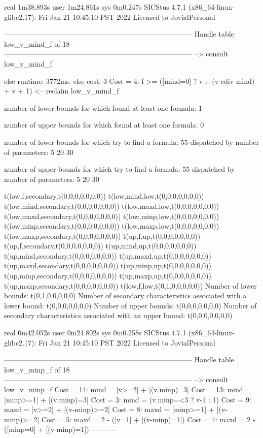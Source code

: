 real	1m38.893s
user	1m24.861s
sys	0m0.247s
SICStus 4.7.1 (x86_64-linux-glibc2.17): Fri Jan 21 10:45:10 PST 2022
Licensed to JovialPersonal


--------------------------------------------------------------------------------
Handle table low_v_mind_f of 18
--------------------------------------------------------------------------------
--> consult low_v_mind_f

else runtime: 3772ms. else cost: 3
Cost =  4:  f >= ([mind=0] ? v : -(v cdiv mind) + v + 1) %
<-- reclaim low_v_mind_f

number of lower bounds for which found at least one formula: 1

number of upper bounds for which found at least one formula: 0

number of lower bounds for which try to find a formula: 55
dispatched by number of parameters: 5  20  30

number of upper bounds for which try to find a formula: 55
dispatched by number of parameters: 5  20  30

t(low,f,secondary,t(0,0,0,0,0,0,0))
t(low,mind,low,t(0,0,0,0,0,0,0))
t(low,mind,secondary,t(0,0,0,0,0,0,0))
t(low,maxd,low,t(0,0,0,0,0,0,0))
t(low,maxd,secondary,t(0,0,0,0,0,0,0))
t(low,minp,low,t(0,0,0,0,0,0,0))
t(low,minp,secondary,t(0,0,0,0,0,0,0))
t(low,maxp,low,t(0,0,0,0,0,0,0))
t(low,maxp,secondary,t(0,0,0,0,0,0,0))
t(up,f,up,t(0,0,0,0,0,0,0))
t(up,f,secondary,t(0,0,0,0,0,0,0))
t(up,mind,up,t(0,0,0,0,0,0,0))
t(up,mind,secondary,t(0,0,0,0,0,0,0))
t(up,maxd,up,t(0,0,0,0,0,0,0))
t(up,maxd,secondary,t(0,0,0,0,0,0,0))
t(up,minp,up,t(0,0,0,0,0,0,0))
t(up,minp,secondary,t(0,0,0,0,0,0,0))
t(up,maxp,up,t(0,0,0,0,0,0,0))
t(up,maxp,secondary,t(0,0,0,0,0,0,0))
t(low,f,low,t(0,1,0,0,0,0,0))
Number of lower bounds:                                             t(0,1,0,0,0,0,0)
Number of secondary characteristics associated with a lower bound:  t(0,0,0,0,0,0,0)
Number of upper bounds:                                             t(0,0,0,0,0,0,0)
Number of secondary characteristics associated with an upper bound: t(0,0,0,0,0,0,0)

real	0m42.052s
user	0m24.802s
sys	0m0.258s
SICStus 4.7.1 (x86_64-linux-glibc2.17): Fri Jan 21 10:45:10 PST 2022
Licensed to JovialPersonal


--------------------------------------------------------------------------------
Handle table low_v_minp_f of 18
--------------------------------------------------------------------------------
--> consult low_v_minp_f
Cost = 14:  mind = [v>=2] + [(v.minp)=3]
Cost = 13:  mind = [minp>=1] + [(v.minp)=3]
Cost =  3:  mind = (v.minp=<3 ? v-1 : 1)
Cost =  9:  maxd = [v>=2] + [(v-minp)>=2]
Cost =  8:  maxd = [minp>=1] + [(v-minp)>=2]
Cost =  5:  maxd = 2 - ([v=1] + [(v-minp)=1])
Cost =  4:  maxd = 2 - ([minp=0] + [(v-minp)=1])
----------

